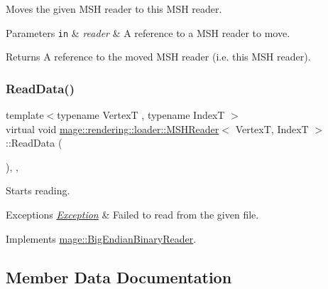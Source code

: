 Moves the given M\+SH reader to this M\+SH reader.


\begin{DoxyParams}[1]{Parameters}
\mbox{\tt in}  & {\em reader} & A reference to a M\+SH reader to move. \\
\hline
\end{DoxyParams}
\begin{DoxyReturn}{Returns}
A reference to the moved M\+SH reader (i.\+e. this M\+SH reader). 
\end{DoxyReturn}
\hypertarget{classmage_1_1rendering_1_1loader_1_1_m_s_h_reader_a99e8e3c50decb9332dc10bcdf7b6e00a}{}\label{classmage_1_1rendering_1_1loader_1_1_m_s_h_reader_a99e8e3c50decb9332dc10bcdf7b6e00a} 
\subsubsection{\texorpdfstring{Read\+Data()}{ReadData()}}
{\footnotesize\ttfamily template$<$typename VertexT , typename IndexT $>$ \\
virtual void \hyperlink{classmage_1_1rendering_1_1loader_1_1_m_s_h_reader}{mage\+::rendering\+::loader\+::\+M\+S\+H\+Reader}$<$ VertexT, IndexT $>$\+::Read\+Data (\begin{DoxyParamCaption}{ }\end{DoxyParamCaption})\hspace{0.3cm}{\ttfamily [override]}, {\ttfamily [private]}, {\ttfamily [virtual]}}

Starts reading.


\begin{DoxyExceptions}{Exceptions}
{\em \hyperlink{classmage_1_1_exception}{Exception}} & Failed to read from the given file. \\
\hline
\end{DoxyExceptions}


Implements \hyperlink{classmage_1_1_big_endian_binary_reader_a7dc0689d598fa91308597b129516a11d}{mage\+::\+Big\+Endian\+Binary\+Reader}.



\subsection{Member Data Documentation}
\hypertarget{classmage_1_1rendering_1_1loader_1_1_m_s_h_reader_acf3ae948f5bb927a167bbb2e5d618916}{}\label{classmage_1_1rendering_1_1loader_1_1_m_s_h_reader_acf3ae948f5bb927a167bbb2e5d618916} 
